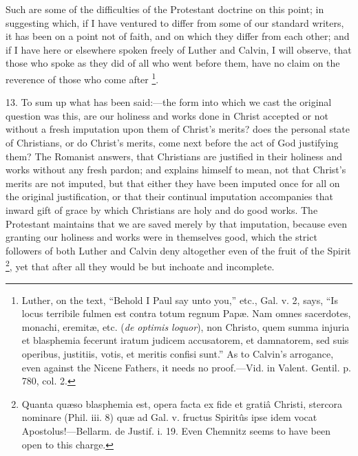 Such are some of the difficulties of the Protestant doctrine on
this point; in suggesting which, if I have ventured to differ from
some of our standard writers, it has been on a point not of faith, and
on which they differ from each other; and if I have here or elsewhere
spoken freely of Luther and Calvin, I will observe, that those who
spoke as they did of all who went before them, have no claim on the
reverence of those who come after \footnote{Luther, on
the text, ``Behold I Paul say unto you,'' etc., Gal. v. 2,
says, ``Is locus terribile fulmen est contra totum regnum Papæ. Nam
omnes sacerdotes, monachi, eremitæ, etc. (\emph{de optimis loquor}),
non Christo, quem summa injuria et blasphemia fecerunt iratum judicem
accusatorem, et damnatorem, sed suis operibus, justitiis, votis, et
meritis confisi sunt.'' As to Calvin's arrogance, even against the
Nicene Fathers, it needs no proof.—Vid. in Valent. Gentil. p. 780,
col. 2.}.

13. To sum up what has been said:—the form into which we cast the
original question was this, are our holiness and works done in Christ
accepted or not without a fresh imputation upon them of Christ's
merits? does the personal state of Christians, or do Christ's merits,
come next before the act of God justifying them? The Romanist answers,
that Christians are justified in their holiness and works without any
fresh pardon; and explains himself to mean, not that Christ's merits
are not imputed, but that either they have been imputed once for all
on the original justification, or that their continual imputation
accompanies that inward gift of grace by which Christians are holy and
do good works. The Protestant maintains that we are saved merely by
that imputation, because even granting our holiness and works were in
themselves good, which the strict followers of both Luther and Calvin
deny altogether even of the fruit of the Spirit \footnote{Quanta quæso
blasphemia est, opera facta ex fide et gratiâ Christi, stercora
nominare (Phil. iii. 8) quæ ad Gal. v. fructus Spiritûs ipse idem
vocat Apostolus!—Bellarm. de Justif. i. 19. Even Chemnitz seems to
have been open to this charge.}, yet that after all they would be but inchoate and
incomplete.

